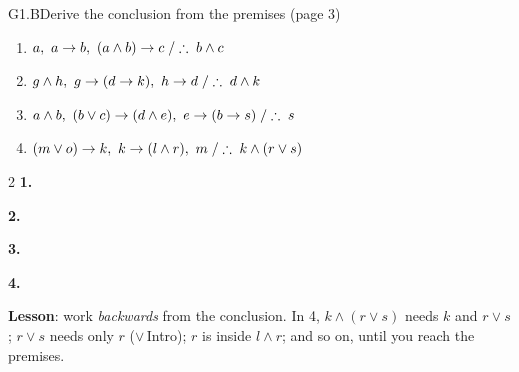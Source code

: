 \begin{nbexercise}{G1.B}{Derive the conclusion from the premises (page 3)}
\begin{enumerate}[nosep]
  \item $a,\ a \rightarrow b,\ (a \land b) \rightarrow c \;/\therefore\; b \land c$
  \item $g \land h,\ g \rightarrow (d \rightarrow k),\ h \rightarrow d \;/\therefore\; d \land k$
  \item $a \land b,\ (b \lor c) \rightarrow (d \land e),\ e \rightarrow (b \rightarrow s) \;/\therefore\; s$
  \item $(m \lor o) \rightarrow k,\ k \rightarrow (l \land r),\ m \;/\therefore\; k \land (r \lor s)$
\end{enumerate}
\end{nbexercise}
\begin{nbsolution}
\begin{multicols}{2}
\textbf{1.}
\begin{fitchproof}
 \RPrem
{} \RPrem
{} \RPrem
{} 
 
 
 
\end{fitchproof}
\textbf{2.}
\begin{fitchproof}
 \RPrem
{} \RPrem
{} \RPrem
{} 
 
 
 
 
 
\end{fitchproof}
\columnbreak
\textbf{3.}
\begin{fitchproof}
 \RPrem
{} \RPrem
{} \RPrem
{} 
 
 
 
 
 
\end{fitchproof}
\textbf{4.}
\begin{fitchproof}
 \RPrem
{} \RPrem
{} \RPrem
{} 
 
 
 
 
 
\end{fitchproof}
\end{multicols}
\textbf{Lesson}: work \emph{backwards} from the conclusion. In 4, $k \land (r \lor s)$ needs
$k$ and $r \lor s$; $r \lor s$ needs only $r$ ($\lor$\,Intro); $r$ is inside $l \land r$;
and so on, until you reach the premises.
\end{nbsolution}

